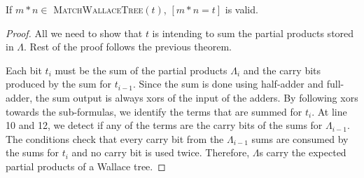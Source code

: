 \begin{thm}
  If $m*n\in$ \textsc{MatchWallaceTree}$(t)$, $[m*n = t]$ is valid.
\end{thm}
\begin{proof}
  All we need to show that $t$ is intending to sum the partial products
  stored in $\Lambda$. Rest of the proof follows the previous theorem.
  
  
  Each bit $t_i$ must be the sum of the partial products $\Lambda_i$ and 
  the carry bits produced by the sum for $t_{i-1}$.
  Since the sum is done using half-adder and full-adder, the sum
  output is always xors of the input of the adders.
  By following xors towards the sub-formulas, we identify the terms
  that are summed for $t_i$.
  At line 10 and 12, we detect if any of the terms are the carry
  bits of the sums for $\Lambda_{i-1}$.
  The conditions check that every carry bit from the  $\Lambda_{i-1}$ sums
  are consumed by the sums for $t_i$ and no carry bit is used twice.
  Therefore, $\Lambda$s carry the expected partial products of a Wallace tree.
\end{proof}


